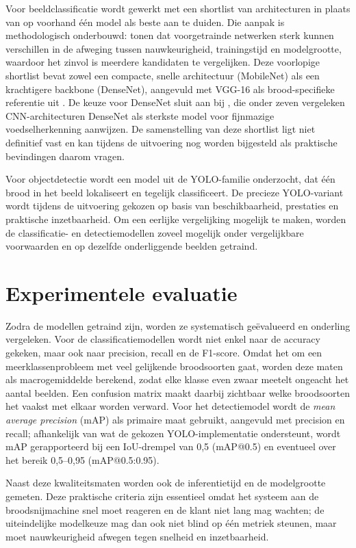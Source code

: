 Voor beeldclassificatie wordt gewerkt met een shortlist van architecturen in plaats
van op voorhand één model als beste aan te duiden. Die aanpak is methodologisch
onderbouwd: \textcite{AbouBaker2022} tonen dat voorgetrainde netwerken sterk kunnen
verschillen in de afweging tussen nauwkeurigheid, trainingstijd en modelgrootte,
waardoor het zinvol is meerdere kandidaten te vergelijken. Deze voorlopige shortlist
bevat zowel een compacte, snelle architectuur (MobileNet) als een krachtigere backbone
(DenseNet), aangevuld met VGG-16 als brood-specifieke referentie uit
\textcite{Tantiphanwadi2022}. De keuze voor DenseNet sluit aan bij \textcite{Boyd2024},
die onder zeven vergeleken CNN-architecturen DenseNet als sterkste model voor
fijnmazige voedselherkenning aanwijzen. De samenstelling van deze shortlist ligt niet
definitief vast en kan tijdens de uitvoering nog worden bijgesteld als praktische
bevindingen daarom vragen.

Voor objectdetectie wordt een model uit de YOLO-familie onderzocht, dat één brood in
het beeld lokaliseert en tegelijk classificeert. De precieze YOLO-variant wordt tijdens
de uitvoering gekozen op basis van beschikbaarheid, prestaties en praktische
inzetbaarheid. Om een eerlijke vergelijking mogelijk te maken, worden de classificatie-
en detectiemodellen zoveel mogelijk onder vergelijkbare voorwaarden en op dezelfde
onderliggende beelden getraind.

\section{Experimentele evaluatie}

Zodra de modellen getraind zijn, worden ze systematisch geëvalueerd en onderling
vergeleken. Voor de classificatiemodellen wordt niet enkel naar de accuracy gekeken,
maar ook naar precision, recall en de F1-score. Omdat het om een meerklassenprobleem
met veel gelijkende broodsoorten gaat, worden deze maten als macrogemiddelde berekend,
zodat elke klasse even zwaar meetelt ongeacht het aantal beelden. Een confusion matrix
maakt daarbij zichtbaar welke broodsoorten het vaakst met elkaar worden verward. Voor
het detectiemodel wordt de \emph{mean average precision} (mAP) als primaire maat
gebruikt, aangevuld met precision en recall; afhankelijk van wat de gekozen
YOLO-implementatie ondersteunt, wordt mAP gerapporteerd bij een IoU-drempel van 0,5
(mAP@0.5) en eventueel over het bereik 0,5--0,95 (mAP@0.5:0.95).

Naast deze kwaliteitsmaten worden ook de inferentietijd en de modelgrootte gemeten.
Deze praktische criteria zijn essentieel omdat het systeem aan de broodsnijmachine
snel moet reageren en de klant niet lang mag wachten; de uiteindelijke modelkeuze mag
dan ook niet blind op één metriek steunen, maar moet nauwkeurigheid afwegen tegen
snelheid en inzetbaarheid.

